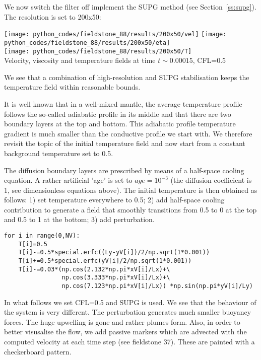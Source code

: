 We now switch the filter off implement the SUPG method (see Section~\ref{ss:supg}). 
The resolution is set to 200x50:
\begin{center}
\texttt{[image: python\_codes/fieldstone\_88/results/200x50/vel]}
\texttt{[image: python\_codes/fieldstone\_88/results/200x50/eta]}\\
\texttt{[image: python\_codes/fieldstone\_88/results/200x50/T]}\\
{\captionfont Velocity, viscosity and temperature fields at time $t\sim 0.00015$, CFL=0.5} 
\end{center}
We see that a combination of high-resolution and SUPG stabilisation keeps the 
temperature field within reasonable bounds. 


It is well known that in a well-mixed mantle, the average temperature profile 
follows the so-called adiabatic profile in its middle and that there are two 
boundary layers at the top and bottom. This adiabatic profile temperature gradient 
is much smaller than the conductive profile we start with.
We therefore revisit the topic of the initial temperature field and now start 
from a constant background temperature set to 0.5. 

The diffusion boundary layers are prescribed by means of a half-space cooling equation.
A rather artificial 'age' is set to $age=10^{-3}$ (the diffusion coefficient is 1, 
see dimensionless equations above).
The initial temperature is then obtained as follows: 1) set temperature everywhere to 0.5; 
2) add half-space cooling contribution to generate a field that smoothly transitions 
from 0.5 to 0 at the top and 0.5 to 1 at the bottom; 3) add perturbation. 

\begin{lstlisting}
for i in range(0,NV):
    T[i]=0.5
    T[i]-=0.5*special.erfc((Ly-yV[i])/2/np.sqrt(1*0.001))
    T[i]+=0.5*special.erfc(yV[i]/2/np.sqrt(1*0.001))
    T[i]-=0.03*(np.cos(2.132*np.pi*xV[i]/Lx)+\
                np.cos(3.333*np.pi*xV[i]/Lx)+\
                np.cos(7.123*np.pi*xV[i]/Lx)) *np.sin(np.pi*yV[i]/Ly)
\end{lstlisting}


In what follows we set CFL=0.5 and SUPG is used.
We see that the behaviour of the system is very different. The perturbation generates 
much smaller buoyancy forces. The huge upwelling is gone and rather plumes form. 
Also, in order to better visusalise the flow, we add passive markers which are 
advected with the computed velocity at each time step (see fieldstone 37).
These are painted with a checkerboard pattern.

